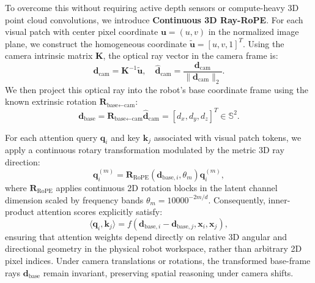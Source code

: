 To overcome this without requiring active depth sensors or compute-heavy 3D point cloud convolutions, we introduce \textbf{Continuous 3D Ray-RoPE}. For each visual patch with center pixel coordinate $\mathbf{u} = (u, v)$ in the normalized image plane, we construct the homogeneous coordinate $\tilde{\mathbf{u}} = [u, v, 1]^T$. Using the camera intrinsic matrix $\mathbf{K}$, the optical ray vector in the camera frame is:
\begin{equation}
\mathbf{d}_{\text{cam}} = \mathbf{K}^{-1} \tilde{\mathbf{u}}, \quad \hat{\mathbf{d}}_{\text{cam}} = \frac{\mathbf{d}_{\text{cam}}}{\|\mathbf{d}_{\text{cam}}\|_2}.
\end{equation}
We then project this optical ray into the robot's base coordinate frame using the known extrinsic rotation $\mathbf{R}_{\text{base}\leftarrow\text{cam}}$:
\begin{equation}
\mathbf{d}_{\text{base}} = \mathbf{R}_{\text{base}\leftarrow\text{cam}} \hat{\mathbf{d}}_{\text{cam}} = [d_x, d_y, d_z]^T \in \mathbb{S}^2.
\end{equation}

For each attention query $\mathbf{q}_i$ and key $\mathbf{k}_j$ associated with visual patch tokens, we apply a continuous rotary transformation modulated by the metric 3D ray direction:
\begin{equation}
\mathbf{q}_i^{(m)} = \mathbf{R}_{\text{RoPE}}\left(\mathbf{d}_{\text{base}, i}, \theta_m\right) \mathbf{q}_i^{(m)},
\end{equation}
where $\mathbf{R}_{\text{RoPE}}$ applies continuous 2D rotation blocks in the latent channel dimension scaled by frequency bands $\theta_m = 10000^{-2m/d}$. Consequently, inner-product attention scores explicitly satisfy:
\begin{equation}
\langle \mathbf{q}_i, \mathbf{k}_j \rangle = f\left(\mathbf{d}_{\text{base}, i} - \mathbf{d}_{\text{base}, j}, \mathbf{x}_i, \mathbf{x}_j\right),
\end{equation}
ensuring that attention weights depend directly on relative 3D angular and directional geometry in the physical robot workspace, rather than arbitrary 2D pixel indices. Under camera translations or rotations, the transformed base-frame rays $\mathbf{d}_{\text{base}}$ remain invariant, preserving spatial reasoning under camera shifts.

